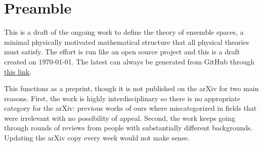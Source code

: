 \documentclass[11pt,letterpaper,fleqn]{memoir}
\begin{document}
\chapter*{Preamble}

This is a draft of the ongoing work to define the theory of ensemble spaces, a minimal physically motivated mathematical structure that all physical theories must satisfy. The effort is run like an open source project and this is a draft created on \today. The latest can always be generated from GitHub through \href{https://latexonline.cc/compile?git=https%3A%2F%2Fgithub.com%2Fassumptionsofphysics%2Fbook&target=art_pm_EnsembleSpaces.tex&command=pdflatex}{this link}.

This functions as a preprint, though it is not published on the arXiv for two main reasons. First, the work is highly interdisciplinary so there is no appropriate category for the arXiv: previous works of ours where miscategorized in fields that were irrelevant with no possibility of appeal. Second, the work keeps going through rounds of reviews from people with substantially different backgrounds. Updating the arXiv copy every week would not make sense.

\setcounter{tocdepth}{3}
\tableofcontents
	

	
	
\end{document}
